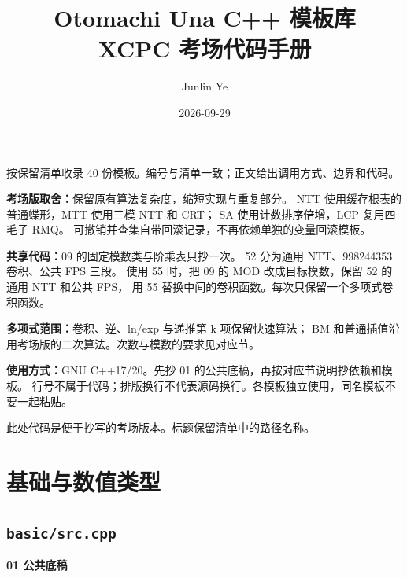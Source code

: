 \documentclass[UTF8,a4paper,10pt]{ctexart}
\title{Otomachi Una C++ 模板库\\XCPC 考场代码手册}
\author{Junlin Ye}
\date{2026-09-29}
\begin{document}
\begin{titlepage}\maketitle\thispagestyle{empty}
\vspace{1cm}
按保留清单收录 40 份模板。编号与清单一致；正文给出调用方式、边界和代码。

\textbf{考场版取舍：}保留原有算法复杂度，缩短实现与重复部分。
NTT 使用缓存根表的普通蝶形，MTT 使用三模 NTT 和 CRT；
SA 使用计数排序倍增，LCP 复用四毛子 RMQ。
可撤销并查集自带回滚记录，不再依赖单独的变量回滚模板。

\textbf{共享代码：}09 的固定模数类与阶乘表只抄一次。
52 分为通用 NTT、998244353 卷积、公共 FPS 三段。
使用 55 时，把 09 的 MOD 改成目标模数，保留 52 的通用 NTT 和公共 FPS，
用 55 替换中间的卷积函数。每次只保留一个多项式卷积函数。

\textbf{多项式范围：}卷积、逆、ln/exp 与递推第 k 项保留快速算法；
BM 和普通插值沿用考场版的二次算法。次数与模数的要求见对应节。

\textbf{使用方式：}GNU C++17/20。先抄 01 的公共底稿，再按对应节说明抄依赖和模板。
行号不属于代码；排版换行不代表源码换行。各模板独立使用，同名模板不要一起粘贴。

\vfill
此处代码是便于抄写的考场版本。标题保留清单中的路径名称。
\end{titlepage}
{\small\tableofcontents}\clearpage

\section{基础与数值类型}
\subsection{\texttt{basic/src.cpp}}
\textbf{01 公共底稿}
\end{document}
